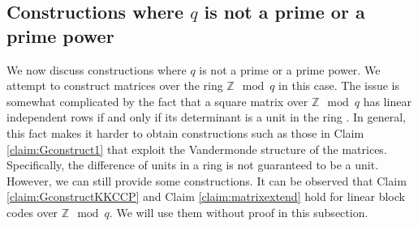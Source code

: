 \documentclass[journal,twocolumn]{IEEEtran}
\theoremstyle{definition}
\newtheorem{claim}{Claim}
\newcommand{\aditya}[1]{\marginpar{+}{\bf Aditya's remark}: {\em #1}}
\newcommand{\litang}[1]{\marginpar{+}{\bf Li's remark}: {\em #1}}
\begin{document}


\subsection{Constructions where $q$ is not a prime or a prime power}
\label{sec:matrices_z_mod_q}
We now discuss constructions where $q$ is not a prime or a prime power. We attempt to construct matrices over the ring $\mathbb{Z} \mod q$ in this case. The issue is somewhat complicated by the fact that a square matrix over $\mathbb{Z} \mod q$ has linear independent rows if and only if its determinant is a unit in the ring \cite{dummit2003abstract}. In general, this fact makes it harder to obtain constructions such as those in Claim \ref{claim:Gconstruct1} that exploit the Vandermonde structure of the matrices. Specifically, the difference of units in a ring is not guaranteed to be a unit. However, we can still provide some constructions. It can be observed that Claim \ref{claim:GconstructKKCCP} and Claim \ref{claim:matrixextend} hold for linear block codes over $\mathbb{Z} \mod q$. We will use them without proof in this subsection. %

\end{document}
